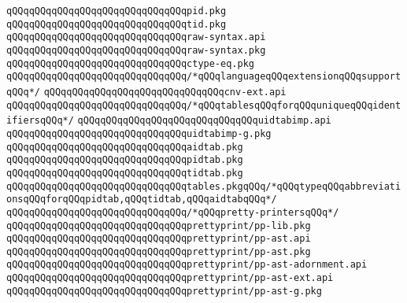 \verb|qQQqqQQqqQQqqQQqqQQqqQQqqQQqqQQqpid.pkg|\newline
\verb|qQQqqQQqqQQqqQQqqQQqqQQqqQQqqQQqtid.pkg|\newline
\newline
\verb|qQQqqQQqqQQqqQQqqQQqqQQqqQQqqQQqraw-syntax.api|\newline
\verb|qQQqqQQqqQQqqQQqqQQqqQQqqQQqqQQqraw-syntax.pkg|\newline
\newline
\verb|qQQqqQQqqQQqqQQqqQQqqQQqqQQqqQQqctype-eq.pkg|\newline
\newline
\verb|qQQqqQQqqQQqqQQqqQQqqQQqqQQqqQQq/*qQQqlanguageqQQqextensionqQQqsupportqQQq*/|\newline
\verb|qQQqqQQqqQQqqQQqqQQqqQQqqQQqqQQqcnv-ext.api|\newline
\newline
\verb|qQQqqQQqqQQqqQQqqQQqqQQqqQQqqQQq/*qQQqtablesqQQqforqQQquniqueqQQqidentifiersqQQq*/|\newline
\verb|qQQqqQQqqQQqqQQqqQQqqQQqqQQqqQQquidtabimp.api|\newline
\verb|qQQqqQQqqQQqqQQqqQQqqQQqqQQqqQQquidtabimp-g.pkg|\newline
\verb|qQQqqQQqqQQqqQQqqQQqqQQqqQQqqQQqaidtab.pkg|\newline
\verb|qQQqqQQqqQQqqQQqqQQqqQQqqQQqqQQqpidtab.pkg|\newline
\verb|qQQqqQQqqQQqqQQqqQQqqQQqqQQqqQQqtidtab.pkg|\newline
\verb|qQQqqQQqqQQqqQQqqQQqqQQqqQQqqQQqtables.pkgqQQq/*qQQqtypeqQQqabbreviationsqQQqforqQQqpidtab,qQQqtidtab,qQQqaidtabqQQq*/|\newline
\newline
\verb|qQQqqQQqqQQqqQQqqQQqqQQqqQQqqQQq/*qQQqpretty-printersqQQq*/|\newline
\verb|qQQqqQQqqQQqqQQqqQQqqQQqqQQqqQQqprettyprint/pp-lib.pkg|\newline
\verb|qQQqqQQqqQQqqQQqqQQqqQQqqQQqqQQqprettyprint/pp-ast.api|\newline
\verb|qQQqqQQqqQQqqQQqqQQqqQQqqQQqqQQqprettyprint/pp-ast.pkg|\newline
\verb|qQQqqQQqqQQqqQQqqQQqqQQqqQQqqQQqprettyprint/pp-ast-adornment.api|\newline
\verb|qQQqqQQqqQQqqQQqqQQqqQQqqQQqqQQqprettyprint/pp-ast-ext.api|\newline
\verb|qQQqqQQqqQQqqQQqqQQqqQQqqQQqqQQqprettyprint/pp-ast-g.pkg|\newline
\newline
